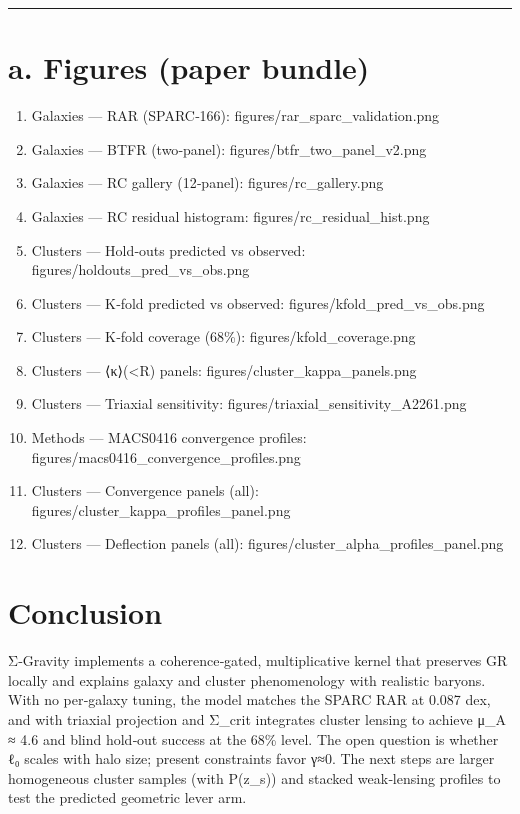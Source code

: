 \documentclass[11pt,a4paper]{article}
\begin{document}
\medskip\hrule\medskip


\section{a. Figures (paper bundle)}


\begin{enumerate}
\item Galaxies — RAR (SPARC‑166): figures/rar\_sparc\_validation.png
\item Galaxies — BTFR (two‑panel): figures/btfr\_two\_panel\_v2.png
\item Galaxies — RC gallery (12‑panel): figures/rc\_gallery.png
\item Galaxies — RC residual histogram: figures/rc\_residual\_hist.png
\item Clusters — Hold‑outs predicted vs observed: figures/holdouts\_pred\_vs\_obs.png
\item Clusters — K‑fold predicted vs observed: figures/kfold\_pred\_vs\_obs.png
\item Clusters — K‑fold coverage (68\%): figures/kfold\_coverage.png
\item Clusters — ⟨κ⟩(<R) panels: figures/cluster\_kappa\_panels.png
\item Clusters — Triaxial sensitivity: figures/triaxial\_sensitivity\_A2261.png
\item Methods — MACS0416 convergence profiles: figures/macs0416\_convergence\_profiles.png
\item Clusters — Convergence panels (all): figures/cluster\_kappa\_profiles\_panel.png
\item Clusters — Deflection panels (all): figures/cluster\_alpha\_profiles\_panel.png
\end{enumerate}


\section{Conclusion}


Σ‑Gravity implements a coherence‑gated, multiplicative kernel that preserves GR locally and explains galaxy and cluster phenomenology with realistic baryons. With no per‑galaxy tuning, the model matches the SPARC RAR at 0.087 dex, and with triaxial projection and Σ\_crit integrates cluster lensing to achieve μ\_A ≈ 4.6 and blind hold‑out success at the 68\% level. The open question is whether ℓ₀ scales with halo size; present constraints favor γ≈0. The next steps are larger homogeneous cluster samples (with P(z\_s)) and stacked weak‑lensing profiles to test the predicted geometric lever arm.
\end{document}
